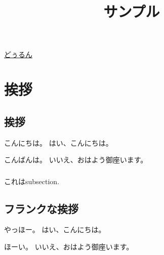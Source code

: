 \documentclass[a4paper,11pt,oneside,openany,report]{jsbook}
\title{サンプル}
\begin{document}
\maketitle
\href{https://twitter.com/NegiIgaiNuki}{どぅるん}

\chapter{挨拶}
\section{挨拶}
こんにちは。
はい、こんにちは。

こんばんは。
いいえ、おはよう御座います。

\subsection{}
これはsubsection.

\section{フランクな挨拶}
やっほー。
はい、こんにちは。

ほーい。
いいえ、おはよう御座います。
\end{document}
